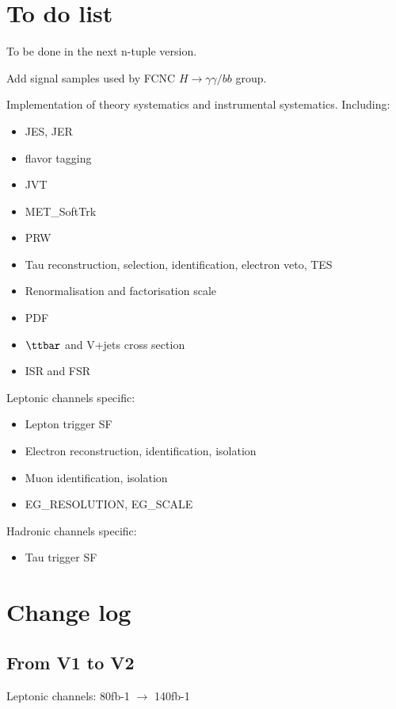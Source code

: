 \section{To do list}

To be done in the next n-tuple version.

Add signal samples used by FCNC $H\to \gamma\gamma/bb$ group.

Implementation of theory systematics and instrumental systematics. Including:

\begin{itemize}
	\item JES, JER
	\item flavor tagging
	\item JVT
	\item MET\_SoftTrk
	\item PRW
	\item Tau reconstruction, selection, identification, electron veto, TES
	\item Renormalisation and factorisation scale
	\item PDF
	\item $\ttbar$ and V+jets cross section
	\item ISR and FSR
\end{itemize}

Leptonic channels specific:
\begin{itemize}
	\item Lepton trigger SF
	\item Electron reconstruction, identification, isolation
	\item Muon identification, isolation
	\item EG\_RESOLUTION, EG\_SCALE
\end{itemize}

Hadronic channels specific:
\begin{itemize}
	\item Tau trigger SF
\end{itemize}

\section{Change log}

\subsection{From V1 to V2}

Leptonic channels:  80fb-1 $\to$ 140fb-1

